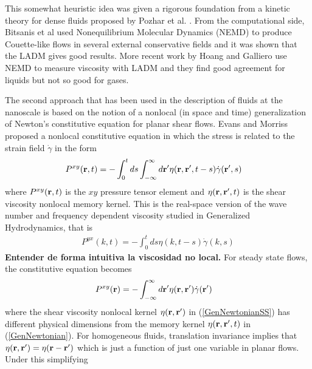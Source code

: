 \documentclass[b5paper,openright,10pt]{book}
\newcommand{\Note}[1]{{\bf \color{red}#1}}    %
\begin{document}
This somewhat  heuristic idea
was given a rigorous foundation from a kinetic theory for dense fluids
proposed by Pozhar et al.  \cite{Pozhar1991a}.  From the computational
side,   Bitsanis  et   al  \cite{Bitsanis1987}   used  Nonequilibrium
Molecular  Dynamics (NEMD)  to produce  Couette-like flows  in several
external conservative fields and it was shown that the LADM gives good
results.    More     recent    work    by    Hoang     and    Galliero
\cite{Hoang2012a,Hoang2012b} use  NEMD to  measure viscosity
with LADM and they find good agreement for liquids but not so good for
gases.

The second approach that has been used in the description of fluids at
the nanoscale  is based  on the  notion of a  nonlocal (in  space and
time)  generalization of  Newton's  constitutive  equation for  planar
shear  flows. Evans and Morriss \cite{EvansMorriss2008} proposed a nonlocal constitutive equation in  which  the  stress is  related  to  the strain  field $\dot{\gamma}$ in the form
\begin{align}
  P^{xy}({\bf r},t)&=-\int_0^t ds \int_{-\infty}^{\infty} d{\bf r}'
\eta({\bf r},{\bf r}',t-s)\dot{\gamma}({\bf r}',s)
\label{GenNewtonian}   %
\end{align}
where  $P^{xy}({\bf r}, t)$ is the $xy$ pressure tensor element and $\eta({\bf r},{\bf  r}',t)$  is the  shear viscosity  nonlocal
memory kernel.  This is the real-space  version of the wave number and
frequency     dependent    viscosity \cite{EvansMorriss2008}     studied    in     Generalized
Hydrodynamics, that is 
\begin{align}
  P^{yx}(k,t) = -\int_0^t ds\eta(k,t-s)\dot{\gamma}(k,s)
\end{align}
\Note{Entender de forma intuitiva la viscosidad no local.}
For  steady  state flows,  the  constitutive  equation
becomes
\begin{align}
  P^{xy}({\bf r})&=-\int_{-\infty}^{\infty} d{\bf r}'
\eta({\bf r},{\bf r}')\dot{\gamma}({\bf r}')
\label{GenNewtonianSS}
\end{align}
where the shear viscosity nonlocal kernel $\eta({\bf r},{\bf r}')$ in
(\ref{GenNewtonianSS})  has  different  physical dimensions  from  the
memory kernel $\eta({\bf r},{\bf r}',t)$ in (\ref{GenNewtonian}).  For
homogeneous  fluids, translation  invariance  implies that  $\eta({\bf
  r},{\bf r}')=\eta({\bf  r}-{\bf r}')$  which is  just a  function of
just   one  variable   in  planar   flows.   Under   this  simplifying
\end{document}
